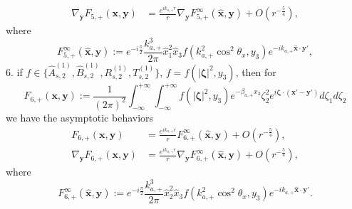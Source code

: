 \documentclass[final,reqno]{siamltex}
\begin{document}
\begin{theorem}
\begin{align*}
  \nabla_{\mathbf{y}}F_{5,+}(\mathbf{x},\mathbf{y})&=\frac{e^{ik_{a,+}r}}{r}\nabla_{\mathbf{y}}F_{5,+}^\infty(\hat{\mathbf{x}},\mathbf{y})+O(r^{-\frac{5}{4}}), 
  \end{align*}
  where 
  $$
  F_{5,+}^\infty(\hat{\mathbf{x}},\mathbf{y}):=e^{-i\frac{\pi}{2}}\frac{k_{a,+}^3}{2\pi}\hat x_1^2\hat x_3f(k_{a,+}^2\cos^2\theta_x,y_3)e^{-ik_{a,+}\hat{\mathbf{x}}\cdot\mathbf{y}'}, 
  $$
  6. if $f\in\{\hat A_{s,2}^{(1)},\hat B_{s,2}^{(1)},R_{s,2}^{(1)},T_{s,2}^{(1)}\}$, $f=f(|\boldsymbol{\zeta}|^2,y_3)$, then for 
  $$
  F_{6,+}(\mathbf{x},\mathbf{y}):=\frac{1}{(2\pi)^2}\int_{-\infty}^{+\infty}\int_{-\infty}^{+\infty}f(|\boldsymbol{\zeta}|^2,y_3)e^{-\beta_{a,+}x_3}\zeta_2^2e^{i\boldsymbol{\zeta}\cdot(\mathbf{x}'-\mathbf{y}')}d\zeta_1d\zeta_2
  $$
  we have the asymptotic behaviors 
  \begin{align*}
  F_{6,+}(\mathbf{x},\mathbf{y})&=\frac{e^{ik_{a,+}r}}{r}F_{6,+}^\infty(\hat{\mathbf{x}},\mathbf{y})+O(r^{-\frac{5}{4}}), \\ 
  \nabla_{\mathbf{y}}F_{6,+}(\mathbf{x},\mathbf{y})&=\frac{e^{ik_{a,+}r}}{r}\nabla_{\mathbf{y}}F_{6,+}^\infty(\hat{\mathbf{x}},\mathbf{y})+O(r^{-\frac{5}{4}}), 
  \end{align*}
  where 
  $$
  F_{6,+}^\infty(\hat{\mathbf{x}},\mathbf{y}):=e^{-i\frac{\pi}{2}}\frac{k_{a,+}^3}{2\pi}\hat x_2^2\hat x_3f(k_{a,+}^2\cos^2\theta_x,y_3)e^{-ik_{a,+}\hat{\mathbf{x}}\cdot\mathbf{y}'}. 
  $$
\end{theorem}
\end{document}
